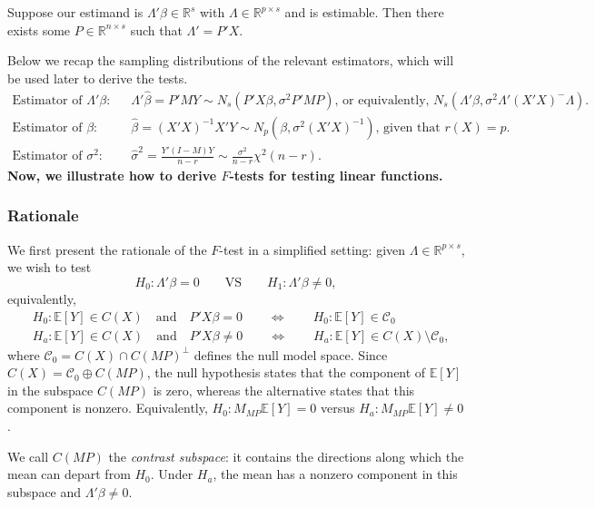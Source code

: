 \documentclass{article}
\theoremstyle{break}
\newcommand{\R}{\ensuremath{\mathbb{R}}}
\newcommand{\E}{\ensuremath{\mathbb{E}}}
\begin{document}
Suppose our estimand is $\Lambda'\beta \in \R^s$ with $\Lambda \in \R^{p \times s}$ and is estimable. Then there exists some $P \in \R^{n \times s}$ such that $\Lambda' = P'X$.

Below we recap the sampling distributions of the relevant estimators, which will be used later to derive the tests.
\begin{align*}
    \text{Estimator of $\Lambda'\beta$:}\qquad & 
    \Lambda'\hat\beta = P'MY \sim N_s(P'X\beta, \sigma^2 P'MP) \text{, or equivalently, } N_s(\Lambda'\beta, \sigma^2 \Lambda'(X'X)^- \Lambda).\\
    \text{Estimator of $\beta$:}\qquad & 
    \hat\beta = (X'X)^{-1}X'Y \sim N_p(\beta, \sigma^2(X'X)^{-1})
    \text{, given that } r(X)=p.\\
    \text{Estimator of $\sigma^2$:}\qquad & 
    \hat\sigma^2 = \frac{Y'(I-M)Y}{n-r} \sim \frac{\sigma^2}{n-r} \chi^2(n-r).
\end{align*}
\textbf{Now, we illustrate how to derive $F$-tests for testing linear functions.}

\subsubsection{Rationale}
We first present the rationale of the $F$-test in a simplified setting: given $\Lambda \in \R^{p\times s}$, we wish to test
\[
H_0: \Lambda'\beta = 0
\qquad\text{VS}\qquad
H_1: \Lambda'\beta \neq 0,
\]
equivalently,
\begin{align*}
    & H_0 : \E[Y] \in C(X) \quad \text{and} \quad P'X\beta = 0 
    \qquad\Longleftrightarrow\qquad 
    H_0 : \E[Y] \in \mathcal C_0\\
    & H_a : \E[Y] \in C(X) \quad \text{and} \quad P'X\beta \neq 0    
    \qquad\Longleftrightarrow\qquad 
    H_a : \E[Y] \in C(X) \setminus \mathcal C_0,
\end{align*}
where $\mathcal C_0 = C(X) \cap C(MP)^\perp$ defines the null model space.
Since $C(X)=\mathcal C_0\oplus C(MP)$, the null hypothesis states that the component of $\E[Y]$ in the subspace $C(MP)$ is zero, whereas the alternative states that this component is nonzero. Equivalently, $H_0:M_{MP}\E[Y]=0$ versus $H_a:M_{MP}\E[Y]\neq 0$. 

We call $C(MP)$ the \emph{contrast subspace}: it contains the directions along which the mean can depart from $H_0$. Under $H_a$, the mean has a nonzero component in this subspace and $\Lambda'\beta \neq 0$.
\end{document}
